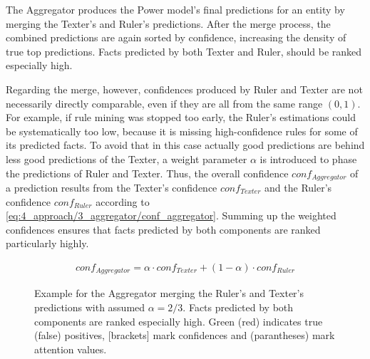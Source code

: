 The Aggregator produces the Power model's final predictions for an entity by merging the Texter's and Ruler's predictions. After the merge process, the combined predictions are again sorted by confidence, increasing the density of true top predictions. Facts predicted by both Texter and Ruler, should be ranked especially high.

Regarding the merge, however, confidences produced by Ruler and Texter are not necessarily directly comparable, even if they are all from the same range $(0, 1)$. For example, if rule mining was stopped too early, the Ruler's estimations could be systematically too low, because it is missing high-confidence rules for some of its predicted facts. To avoid that in this case actually good predictions are behind less good predictions of the Texter, a weight parameter $\alpha$ is introduced to phase the predictions of Ruler and Texter. Thus, the overall confidence $conf_{Aggregator}$ of a prediction results from the Texter's confidence $conf_{Texter}$ and the Ruler's confidence $conf_{Ruler}$ according to \autoref{eq:4_approach/3_aggregator/conf_aggregator}. Summing up the weighted confidences ensures that facts predicted by both components are ranked particularly highly.

\begin{align}
    conf_{Aggregator} = \alpha \cdot conf_{Texter} + (1 - \alpha) \cdot conf_{Ruler}
    \label{eq:4_approach/3_aggregator/conf_aggregator}
\end{align}

\begin{figure}[t]
    \caption{Example for the Aggregator merging the Ruler's and Texter's predictions with assumed $\alpha = 2/3$. Facts predicted by both components are ranked especially high. Green (red) indicates true (false) positives, [brackets] mark confidences and (parantheses) mark attention values.}
    \label{fig:4_approach/3_aggregator/lucy}
\end{figure}

